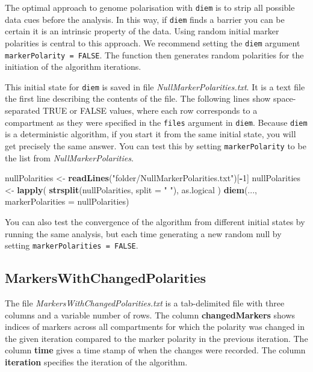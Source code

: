 \documentclass[
]{book}
\newenvironment{Shaded}{\begin{snugshade}}{\end{snugshade}}
\newcommand{\AttributeTok}[1]{\textcolor[rgb]{0.13,0.29,0.53}{#1}}
\newcommand{\DecValTok}[1]{\textcolor[rgb]{0.00,0.00,0.81}{#1}}
\newcommand{\FunctionTok}[1]{\textcolor[rgb]{0.13,0.29,0.53}{\textbf{#1}}}
\newcommand{\NormalTok}[1]{#1}
\newcommand{\OtherTok}[1]{\textcolor[rgb]{0.56,0.35,0.01}{#1}}
\newcommand{\SpecialCharTok}[1]{\textcolor[rgb]{0.81,0.36,0.00}{\textbf{#1}}}
\newcommand{\StringTok}[1]{\textcolor[rgb]{0.31,0.60,0.02}{#1}}
\begin{document}
The optimal approach to genome polarisation with \texttt{diem} is to strip all possible data cues before the analysis. In this way, if \texttt{diem} finds a barrier you can be certain it is an intrinsic property of the data. Using random initial marker polarities is central to this approach. We recommend setting the \texttt{diem} argument \texttt{markerPolarity\ =\ FALSE}. The function then generates random polarities for the initiation of the algorithm iterations.

This initial state for \texttt{diem} is saved in file \emph{NullMarkerPolarities.txt}. It is a text file the first line describing the contents of the file. The following lines show space-separated TRUE or FALSE values, where each row corresponds to a compartment as they were specified in the \texttt{files} argument in \texttt{diem}. Because \texttt{diem} is a deterministic algorithm, if you start it from the same initial state, you will get precisely the same answer. You can test this by setting \texttt{markerPolarity} to be the list from \emph{NullMarkerPolarities}.

\begin{Shaded}
\begin{Highlighting}[]
\NormalTok{nullPolarities }\OtherTok{\textless{}{-}} \FunctionTok{readLines}\NormalTok{(}\StringTok{"folder/NullMarkerPolarities.txt"}\NormalTok{)[}\SpecialCharTok{{-}}\DecValTok{1}\NormalTok{]}
\NormalTok{nullPolarities }\OtherTok{\textless{}{-}} \FunctionTok{lapply}\NormalTok{(}
    \FunctionTok{strsplit}\NormalTok{(nullPolarities, }\AttributeTok{split =} \StringTok{" "}\NormalTok{),}
\NormalTok{    as.logical}
\NormalTok{)}
\FunctionTok{diem}\NormalTok{(..., }\AttributeTok{markerPolarities =}\NormalTok{ nullPolarities)}
\end{Highlighting}
\end{Shaded}

You can also test the convergence of the algorithm from different initial states by running the same analysis, but each time generating a new random null by setting \texttt{markerPolarities\ =\ FALSE}.

\subsection{MarkersWithChangedPolarities}\label{changedPolarities}

The file \emph{MarkersWithChangedPolarities.txt} is a tab-delimited file with three columns and a variable number of rows. The column \textbf{changedMarkers} shows indices of markers across all compartments for which the polarity was changed in the given iteration compared to the marker polarity in the previous iteration. The column \textbf{time} gives a time stamp of when the changes were recorded. The column \textbf{iteration} specifies the iteration of the algorithm.
\end{document}
